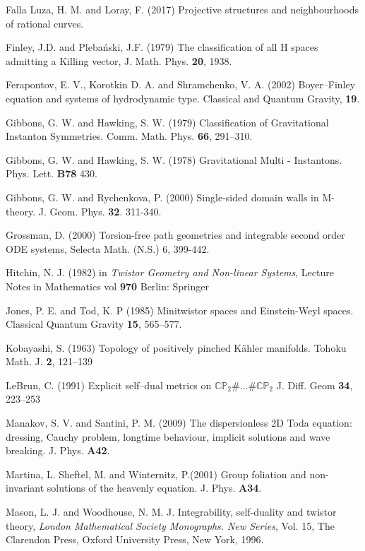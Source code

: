 \begin{thebibliography}{}
 Falla Luza, H. M. and Loray, F. (2017)  Projective structures and neighbourhoods of rational curves.

 Finley, J.D. and Pleba\'nski, J.F. (1979) The classification of all H spaces admitting a Killing
vector, J. Math. Phys. {\bf 20}, 1938.

  Ferapontov, E.  V., Korotkin D. A.  and Shramchenko, V. A. (2002)
Boyer–Finley equation and systems of hydrodynamic type.
Classical and Quantum Gravity, {\bf 19}.

 Gibbons, G. W. and Hawking, S. W. (1979) Classification of Gravitational Instanton Symmetries.
Comm. Math. Phys. {\bf 66}, 291--310.

Gibbons, G. W. and Hawking, S. W. (1978)
Gravitational Multi - Instantons.
Phys. Lett. \textbf{B78}
430.

Gibbons, G. W. and Rychenkova, P. (2000)
Single-sided domain walls in M-theory.
J. Geom. Phys. \textbf{32}. 311-340.

 Grossman, D. (2000) Torsion-free path geometries and integrable second order ODE systems, Selecta
Math. (N.S.) 6, 399-442.

 Hitchin, N. J. (1982) in {\em Twistor Geometry and Non-linear Systems}, Lecture Notes in Mathematics vol {\bf 970} Berlin: Springer

Jones, P. E. and  Tod, K. P (1985)
Minitwistor spaces and Einstein-Weyl spaces. 
Classical Quantum Gravity {\bf 15}, 565--577.

Kobayashi, S. (1963)
Topology of positively pinched K\"ahler manifolds.
Tohoku Math. J. {\bf 2}, 121--139

 LeBrun, C. (1991)
Explicit self--dual metrics on $\mathbb{CP}_2\#\dots \#\mathbb{CP}_2$
J. Diff. Geom {\bf 34}, 223--253

 Manakov, S. V. and Santini, P. M. (2009)
The dispersionless 2D Toda equation: dressing, Cauchy problem, longtime behaviour, implicit solutions and wave breaking. J. Phys. {\bf A42}.

Martina, L. Sheftel, M. and Winternitz, P.(2001)
Group foliation and non-invariant
solutions of the heavenly equation.
J. Phys. {\bf A34}.

 Mason, L. J. and Woodhouse, N. M. J.  Integrability, self-duality and twistor theory, {\em London Mathematical Society Monographs. New Series}, Vol. 15, The Clarendon Press, Oxford University Press, New York, 1996.



\end{thebibliography}
